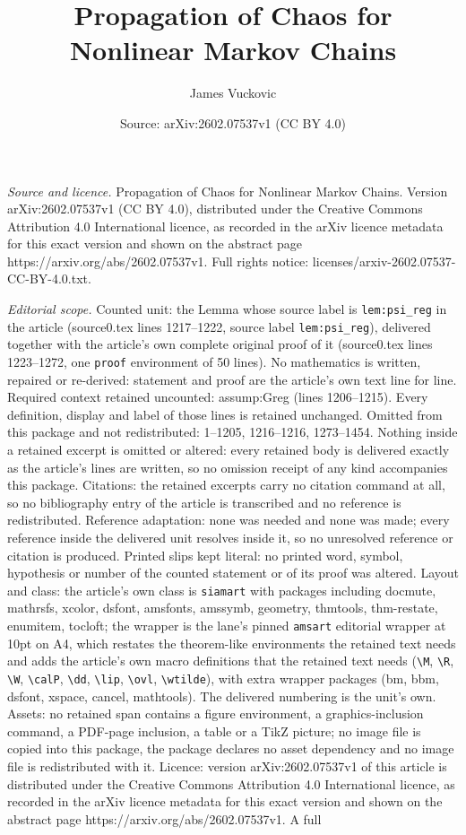 \documentclass[10pt,a4paper]{amsart}
\title[Propagation of Chaos for Nonlinear Markov Chains]{Propagation of Chaos for Nonlinear Markov Chains}
\author{James Vuckovic}
\date{Source: arXiv:2602.07537v1 (CC BY 4.0)}
\begin{document}
\maketitle

\noindent\emph{Source and licence.} Propagation of Chaos for Nonlinear Markov Chains. Version arXiv:2602.07537v1 (CC BY 4.0), distributed under the Creative Commons Attribution 4.0 International licence, as recorded in the arXiv licence metadata for this exact version and shown on the abstract page https://arxiv.org/abs/2602.07537v1. Full rights notice: licenses/arxiv-2602.07537-CC-BY-4.0.txt.\par\smallskip

\noindent\textit{Editorial scope.} Counted unit: the Lemma whose source label is \texttt{lem:psi\_reg} in the article (source0.tex lines 1217--1222, source label \texttt{lem:psi\_reg}), delivered together with the article's own complete original proof of it (source0.tex lines 1223--1272, one \texttt{proof} environment of 50 lines). No mathematics is written, repaired or re-derived: statement and proof are the article's own text line for line. Required context retained uncounted: assump:Greg (lines 1206--1215). Every definition, display and label of those lines is retained unchanged. Omitted from this package and not redistributed: 1--1205, 1216--1216, 1273--1454. Nothing inside a retained excerpt is omitted or altered: every retained body is delivered exactly as the article's lines are written, so no omission receipt of any kind accompanies this package. Citations: the retained excerpts carry no citation command at all, so no bibliography entry of the article is transcribed and no reference is redistributed. Reference adaptation: none was needed and none was made; every reference inside the delivered unit resolves inside it, so no unresolved reference or citation is produced. Printed slips kept literal: no printed word, symbol, hypothesis or number of the counted statement or of its proof was altered. Layout and class: the article's own class is \texttt{siamart} with packages including docmute, mathrsfs, xcolor, dsfont, amsfonts, amssymb, geometry, thmtools, thm-restate, enumitem, tocloft; the wrapper is the lane's pinned \texttt{amsart} editorial wrapper at 10pt on A4, which restates the theorem-like environments the retained text needs and adds the article's own macro definitions that the retained text needs (\texttt{\textbackslash M}, \texttt{\textbackslash R}, \texttt{\textbackslash W}, \texttt{\textbackslash calP}, \texttt{\textbackslash dd}, \texttt{\textbackslash lip}, \texttt{\textbackslash ovl}, \texttt{\textbackslash wtilde}), with extra wrapper packages (bm, bbm, dsfont, xspace, cancel, mathtools). The delivered numbering is the unit's own. Assets: no retained span contains a figure environment, a graphics-inclusion command, a PDF-page inclusion, a table or a TikZ picture; no image file is copied into this package, the package declares no asset dependency and no image file is redistributed with it. Licence: version arXiv:2602.07537v1 of this article is distributed under the Creative Commons Attribution 4.0 International licence, as recorded in the arXiv licence metadata for this exact version and shown on the abstract page https://arxiv.org/abs/2602.07537v1. A full 
\end{document}
